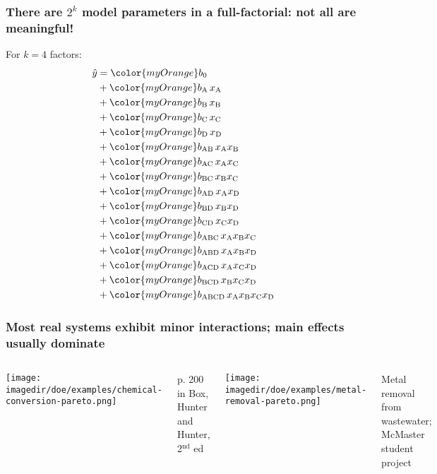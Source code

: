 \begin{frame}\frametitle{There are $2^k$ model parameters in a full-factorial: not all are meaningful!}
	\vspace{6pt}
	For $k=4$ factors:
	\vspace{-6pt}
		{\scriptsize
		\begin{align*}
			\hat{y} &= {\color{myOrange}b_0}\\
					&+ {\color{myOrange}b_\text{A}\,}x_\text{A}\\
					&+ {\color{myOrange}b_\text{B}\,}x_\text{B}\\
					&+ {\color{myOrange}b_\text{C}\,}x_\text{C}\\
					&+ {\color{myOrange}b_\text{D}\,}x_\text{D}\\
					&+ {\color{myOrange}b_\text{AB}\,}x_\text{A}x_\text{B}\\
					&+ {\color{myOrange}b_\text{AC}\,}x_\text{A}x_\text{C}\\
					&+ {\color{myOrange}b_\text{BC}\,}x_\text{B}x_\text{C}\\
					&+ {\color{myOrange}b_\text{AD}\,}x_\text{A}x_\text{D}\\
					&+ {\color{myOrange}b_\text{BD}\,}x_\text{B}x_\text{D}\\
					&+ {\color{myOrange}b_\text{CD}\,}x_\text{C}x_\text{D}\\
					&+ {\color{myOrange}b_\text{ABC}\,}x_\text{A}x_\text{B}x_\text{C}\\
					&+ {\color{myOrange}b_\text{ABD}\,}x_\text{A}x_\text{B}x_\text{D}\\
					&+ {\color{myOrange}b_\text{ACD}\,}x_\text{A}x_\text{C}x_\text{D}\\
					&+ {\color{myOrange}b_\text{BCD}\,}x_\text{B}x_\text{C}x_\text{D}\\
					&+ {\color{myOrange}b_\text{ABCD}\,}x_\text{A}x_\text{B}x_\text{C}x_\text{D}
		\end{align*}
		}
	

\end{frame}

\begin{frame}\frametitle{Most real systems exhibit minor interactions; main effects usually dominate}
	\begin{columns}[T]
			\texttt{[image: \\imagedir/doe/examples/chemical-conversion-pareto.png]}
			
			{\tiny p. 200 in Box, Hunter and Hunter, 2$^\text{nd}$ ed}
			
			\texttt{[image: \\imagedir/doe/examples/metal-removal-pareto.png]}
			
			{\tiny Metal removal from wastewater; McMaster student project}
			
	\end{columns}
	
\end{frame}

